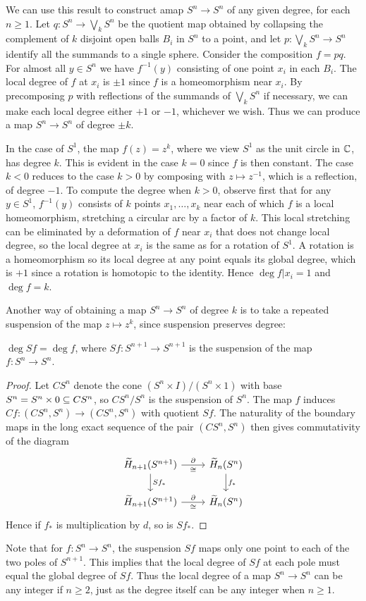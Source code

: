 \begin{example}\label{map any degree}
We can use this result to construct amap $S^n\to S^n$ of any given degree, for each $n\geq1$. Let $q:S^n\to\bigvee_kS^n$ be the quotient map obtained by collapsing the complement of $k$ disjoint open balls $B_i$ in $S^n$ to a point, and let $p:\bigvee_kS^n\to S^n$ identify all the summands to a single sphere. Consider the composition $f=pq$. For almost all $y\in S^n$ we have $f^{-1}(y)$ consisting of one point $x_i$ in each $B_i$. The local degree of $f$ at $x_i$ is $\pm1$ since $f$ is a homeomorphism near $x_i$. By precomposing $p$ with reflections of the summands of $\bigvee_kS^n$ if necessary, we can make each local degree either $+1$ or $-1$, whichever we wish. Thus we can produce a map $S^n\to S^n$ of degree $\pm k$.
\end{example}
\begin{example}
In the case of $S^1$, the map $f(z)=z^k$, where we view $S^1$ as the unit circle in $\mathbb{C}$, has degree $k$. This is evident in the case $k=0$ since $f$ is then constant. The case $k<0$ reduces to the case $k>0$ by composing with $z\mapsto z^{-1}$, which is a
reflection, of degree $-1$. To compute the degree when $k>0$, observe first that for any $y\in S^1$, $f^{-1}(y)$ consists of $k$ points $x_1,\dots,x_k$ near each of which $f$ is a local
homeomorphism, stretching a circular arc by a factor of $k$. This local stretching can be eliminated by a deformation of $f$ near $x_i$ that does not change local degree, so the local degree at $x_i$ is the same as for a rotation of $S^1$. A rotation is a homeomorphism so its local degree at any point equals its global degree, which is $+1$ since a rotation is homotopic to the identity. Hence $\deg f|x_i=1$ and $\deg f=k$.
\end{example}
Another way of obtaining a map $S^n\to S^n$ of degree $k$ is to take a repeated suspension of the map $z\mapsto z^k$, since suspension preserves degree:
\begin{proposition}
$\deg Sf=\deg f$, where $Sf:S^{n+1}\to S^{n+1}$ is the suspension of the map $f:S^n\to S^n$.
\end{proposition}
\begin{proof}
Let $CS^n$ denote the cone $(S^n\times I)/(S^n\times1)$ with base $S^n=S^n\times 0\subseteq CS^n$, so $CS^n/S^n$ is the suspension of $S^n$. The map $f$ induces $Cf:(CS^n,S^n)\to(CS^n,S^n)$ with quotient $Sf$. The naturality of the boundary maps in the long exact sequence of the pair $(CS^n,S^n)$ then gives commutativity of the diagram
\[\begin{tikzcd}
\widetilde{H}_{n+1}(S^{n+1})\ar[r,"\partial","\cong"']\ar[d,"Sf_*"]&\widetilde{H}_n(S^n)\ar[d,"f_*"]\\
\widetilde{H}_{n+1}(S^{n+1})\ar[r,"\partial","\cong"']&\widetilde{H}_n(S^n)
\end{tikzcd}\]
Hence if $f_*$ is multiplication by $d$, so is $Sf_*$.
\end{proof}
Note that for $f:S^n\to S^n$, the suspension $Sf$ maps only one point to each of the two poles of $S^{n+1}$. This implies that the local degree of $Sf$ at each pole must equal the global degree of $Sf$. Thus the local degree of a map $S^n\to S^n$ can be any integer if $n\geq2$, just as the degree itself can be any integer when $n\geq1$.
